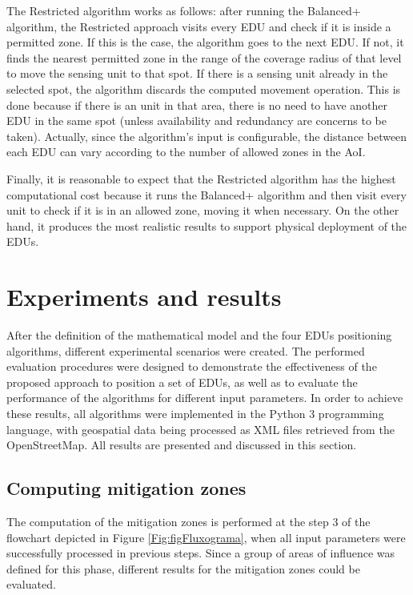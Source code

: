 \begin{refsection}
The Restricted algorithm works as follows: after running the Balanced+ algorithm, the Restricted approach visits every EDU and check if it is inside a permitted zone. If this is the case, the algorithm goes to the next EDU. If not, it finds the nearest permitted zone in the range of the coverage radius of that level to move the sensing unit to that spot. If there is a sensing unit already in the selected spot, the algorithm discards the computed movement operation. This is done because if there is an unit in that area, there is no need to have another EDU in the same spot (unless availability and redundancy are concerns to be taken). Actually, since the algorithm's input is configurable, the distance between each EDU can vary according to the number of allowed zones in the AoI. 

Finally, it is reasonable to expect that the Restricted algorithm has the highest computational cost because it runs the Balanced+ algorithm and then visit every unit to check if it is in an allowed zone, moving it when necessary. On the other hand, it produces the most realistic results to support physical deployment of the EDUs.

\section{Experiments and results}
\label{S:5}

After the definition of the mathematical model and the four EDUs positioning algorithms, different experimental scenarios were created. The performed evaluation procedures were designed to demonstrate the effectiveness of the proposed approach to position a set of EDUs, as well as to evaluate the performance of the algorithms for different input parameters. In order to achieve these results, all algorithms were implemented in the Python 3 programming language, with geospatial data being processed as XML files retrieved from the OpenStreetMap. All results are presented and discussed in this section.

\subsection{Computing mitigation zones}

The computation of the mitigation zones is performed at the step 3 of the flowchart depicted in Figure \ref{Fig:figFluxograma}, when all input parameters were successfully processed in previous steps. Since a group of areas of influence was defined for this phase, different results for the mitigation zones could be evaluated. 


\end{refsection}
